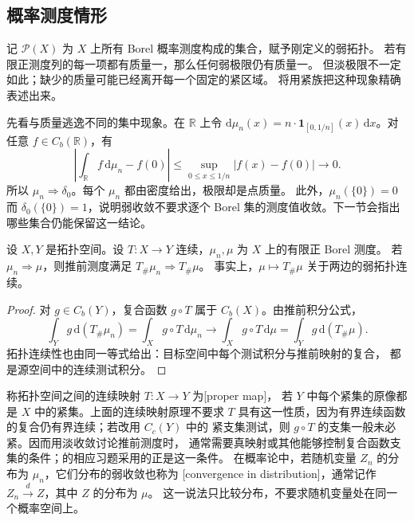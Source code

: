 \subsection{概率测度情形}
\label{b1:subsec:120104}

记 \(\mathcal P(X)\) 为 \(X\) 上所有 Borel 概率测度构成的集合，赋予刚定义的弱拓扑。
若有限正测度列的每一项都有质量一，那么任何弱极限仍有质量一。
但淡极限不一定如此；缺少的质量可能已经离开每一个固定的紧区域。
将用紧族把这种现象精确表述出来。

\ProseParagraphBreak

先看与质量逃逸不同的集中现象。在 \(\mathbb R\) 上令
\(\mathrm{d}\mu_n(x)=n\cdot\mathbf1_{[0,1/n]}(x)\,\mathrm{d}x\)。对任意 \(f\in C_b(\mathbb R)\)，有
\[
 \left|\int_{\mathbb R}f\,\mathrm{d}\mu_n-f(0)\right|
 \leq\sup_{0\leq x\leq1/n}|f(x)-f(0)|\longrightarrow0.
\]
所以 \(\mu_n\Rightarrow\delta_0\)。每个 \(\mu_n\) 都由密度给出，极限却是点质量。
此外，\(\mu_n(\{0\})=0\) 而 \(\delta_0(\{0\})=1\)，说明弱收敛不要求逐个
Borel 集的测度值收敛。下一节会指出哪些集合仍能保留这一结论。

\begin{proposition}[连续映射原理]\label{b1:prop:weak-continuous-mapping}
设 \(X,Y\) 是拓扑空间。设 \(T:X\to Y\) 连续，\(\mu_n,\mu\) 为 \(X\) 上的有限正 Borel 测度。
若 \(\mu_n\Rightarrow\mu\)，则推前测度满足 \(T_\#\mu_n\Rightarrow T_\#\mu\)。
事实上，\(\mu\mapsto T_\#\mu\) 关于两边的弱拓扑连续。
\end{proposition}
\begin{proof}
对 \(g\in C_b(Y)\)，复合函数 \(g\circ T\) 属于 \(C_b(X)\)。由推前积分公式，
\[
 \int_Y g\,\mathrm{d}(T_\#\mu_n)=\int_X g\circ T\,\mathrm{d}\mu_n
 \longrightarrow\int_X g\circ T\,\mathrm{d}\mu=\int_Y g\,\mathrm{d}(T_\#\mu).
\]
拓扑连续性也由同一等式给出：目标空间中每个测试积分与推前映射的复合，
都是源空间中的连续测试积分。
\end{proof}

称拓扑空间之间的连续映射 \(T:X\to Y\) 为[proper map]，
若 \(Y\) 中每个紧集的原像都是 \(X\) 中的紧集。上面的连续映射原理不要求
\(T\) 具有这一性质，因为有界连续函数的复合仍有界连续；若改用 \(C_c(Y)\) 中的
紧支集测试，则 \(g\circ T\) 的支集一般未必紧。因而用淡收敛讨论推前测度时，
通常需要真映射或其他能够控制复合函数支集的条件；的相应习题采用的正是这一条件。
在概率论中，若随机变量 \(Z_n\) 的分布为 \(\mu_n\)，它们分布的弱收敛也称为%
[convergence in distribution]，通常记作
\(Z_n\xrightarrow{d}Z\)，其中 \(Z\) 的分布为 \(\mu\)。
这一说法只比较分布，不要求随机变量处在同一个概率空间上。

